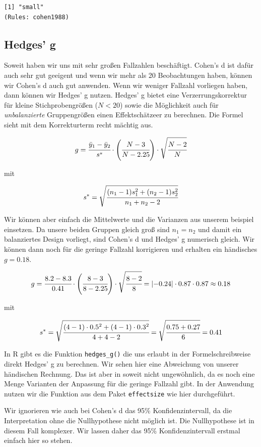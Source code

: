 \documentclass[
  letterpaper,
]{scrbook}
\begin{document}
\begin{verbatim}
[1] "small"
(Rules: cohen1988)
\end{verbatim}

\hypertarget{hedges-g}{%
\subsection{Hedges' g}\label{hedges-g}}

Soweit haben wir uns mit sehr großen Fallzahlen beschäftigt. Cohen's d
ist dafür auch sehr gut geeigent und wenn wir mehr als 20 Beobachtungen
haben, können wir Cohen's d auch gut anwenden. Wenn wir weniger Fallzahl
vorliegen haben, dann können wir Hedges' g nutzen. Hedges' g bietet eine
Verzerrungskorrektur für kleine Stichprobengrößen (\(N < 20\)) sowie die
Möglichkeit auch für \emph{unbalanzierte} Gruppengrößen einen
Effektschätzeer zu berechnen. Die Formel sieht mit dem Korrekturterm
recht mächtig aus.

\[
g = \cfrac{\bar{y}_1 - \bar{y}_2}{s^*} \cdot \left(\cfrac{N-3}{N-2.25}\right) \cdot \sqrt{\cfrac{N-2}{N}}
\]

mit

\[
s^* = \sqrt{\cfrac{(n_1-1)s_1^2 + (n_2-1)s_2^2}{n_1+n_2-2}}
\]

Wir können aber einfach die Mittelwerte und die Varianzen aus unserem
beispiel einsetzen. Da unsere beiden Gruppen gleich groß sind
\(n_1 = n_2\) und damit ein balanziertes Design vorliegt, sind Cohen's d
und Hedges' g numerisch gleich. Wir können dann noch für die geringe
Fallzahl korrigieren und erhalten ein händisches \(g = 0.18\).

\[
g = \cfrac{8.2 - 8.3}{0.41} \cdot \left(\cfrac{8-3}{8-2.25}\right) \cdot \sqrt{\cfrac{8-2}{8}} = \lvert-0.24\rvert \cdot 0.87 \cdot 0.87 \approx 0.18
\]

mit

\[
s^* = \sqrt{\cfrac{(4-1)\cdot0.5^2 + (4-1)\cdot0.3^2}{4+4-2}} = \sqrt{\cfrac{0.75 + 0.27}{6}} = 0.41
\]

In R gibt es die Funktion \texttt{hedges\_g()} die uns erlaubt in der
Formelschreibweise direkt Hedges' g zu berechnen. Wir sehen hier eine
Abweichung von unserer händischen Rechnung. Das ist aber in soweit nicht
ungewöhnlich, da es noch eine Menge Varianten der Anpassung für die
geringe Fallzahl gibt. In der Anwendung nutzen wir die Funktion aus dem
Paket \texttt{effectsize} wie hier durchgeführt.

Wir ignorieren wie auch bei Cohen's d das 95\% Konfidenzintervall, da
die Interpretation ohne die Nullhypothese nicht möglich ist. Die
Nullhypothese ist in diesem Fall komplexer. Wir lassen daher das 95\%
Konfidenzintervall erstmal einfach hier so stehen.
\end{document}
